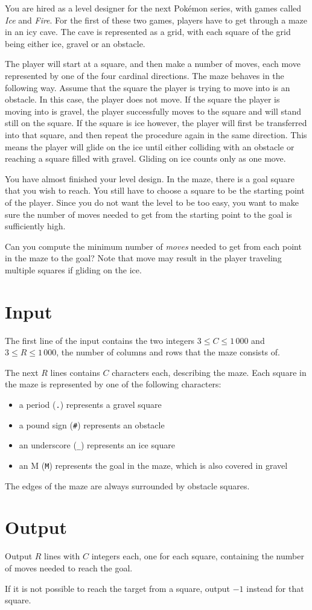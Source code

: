 You are hired as a level designer for the next Pokémon series, with games called \emph{Ice} and \emph{Fire}.
For the first of these two games, players have to get through a maze in an icy cave.
The cave is represented as a grid, with each square of the grid being either ice, gravel or an obstacle.

The player will start at a square, and then make a number of moves, each move represented by one of the four cardinal directions.
The maze behaves in the following way.
Assume that the square the player is trying to move into is an obstacle.
In this case, the player does not move.
If the square the player is moving into is gravel, the player successfully moves to the square and will stand still on the square.
If the square is ice however, the player will first be transferred into that square, and then repeat the procedure again in the same direction.
This means the player will glide on the ice until either colliding with an obstacle or reaching a square filled with gravel.
Gliding on ice counts only as one move.

You have almost finished your level design.
In the maze, there is a goal square that you wish to reach.
You still have to choose a square to be the starting point of the player.
Since you do not want the level to be too easy, you want to make sure the number of moves needed to get from the starting point to the goal is sufficiently high.

Can you compute the minimum number of \emph{moves} needed to get from each point in the maze to the goal?
Note that move may result in the player traveling multiple squares if gliding on the ice.

\section*{Input}
The first line of the input contains the two integers $3 \le C \le 1\,000$ and $3 \le R \le 1\,000$, the number of columns and rows that the maze consists of.

The next $R$ lines contains $C$ characters each, describing the maze.
Each square in the maze is represented by one of the following characters:
\begin{itemize}
\item a period (\texttt{.}) represents a gravel square
\item a pound sign (\texttt{\#}) represents an obstacle
\item an underscore (\texttt{\_}) represents an ice square
\item an M (\texttt{M}) represents the goal in the maze, which is also covered in gravel
\end{itemize}

The edges of the maze are always surrounded by obstacle squares.

\section*{Output}
Output $R$ lines with $C$ integers each, one for each square, containing the number of moves needed to reach the goal.

If it is not possible to reach the target from a square, output $-1$ instead for that square.
